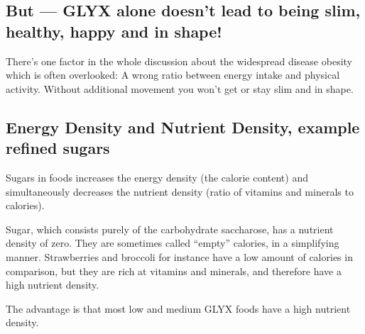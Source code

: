 \documentclass[../main.tex]{subfiles}
\begin{document}
\subsection{But --- GLYX alone doesn't lead to being slim, healthy, happy and in shape!}

There's one factor in the  whole discussion about the widespread disease obesity which is often overlooked:
A wrong ratio between energy intake and physical activity.
Without additional movement you won't get or stay slim and in shape.

\subsection{Energy Density and Nutrient Density, example refined sugars}

Sugars in foods increases the energy density (the calorie content) and simultaneously
decreases the nutrient density (ratio of vitamins and minerals to calories).

Sugar, which consists purely of the carbohydrate saccharose, has a nutrient density of zero.
They are sometimes called ``empty'' calories, in a simplifying manner.
Strawberries and broccoli for instance have a low amount of calories in comparison, but they are rich at vitamins and minerals,
and therefore have a high nutrient density.

The advantage is that most low and medium GLYX foods have a high nutrient density.
\end{document}
